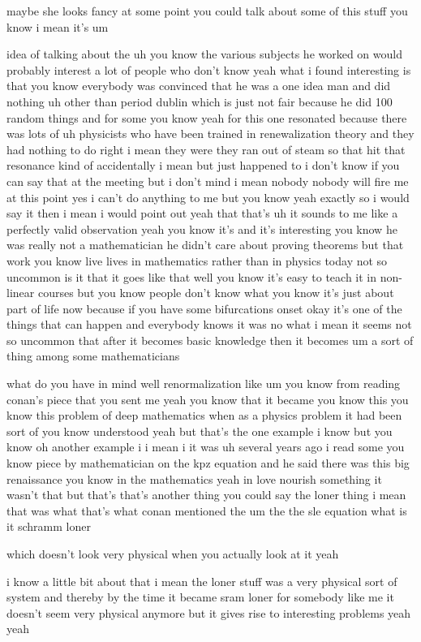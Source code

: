 \begin{description}
maybe she looks fancy at some point you could talk about some of this stuff you know i mean it's um

idea of talking about the uh you know the various subjects he worked on would probably interest a lot of people who don't know yeah what i found interesting is that you know everybody was convinced that he was a one idea man and did nothing uh other than period dublin which is just not fair because he did 100 random things and for some you know yeah for this one resonated because there was lots of uh physicists who have been trained in renewalization theory and they had nothing to do right i mean they were they ran out of steam so that hit that resonance kind of accidentally i mean but just happened to i don't know if you can say that at the meeting but i don't mind i mean nobody nobody will fire me at this point yes i can't do anything to me but you know yeah exactly so i would say it then i mean i would point out yeah that that's uh it sounds to me like a perfectly valid observation yeah you know it's and it's interesting you know he was really not a mathematician he didn't care about proving theorems but that work you know live lives in mathematics rather than in physics today not so uncommon is it that it goes like that well you know it's easy to teach it in non-linear courses but you know people don't know what you know it's just about part of life now because if you have some bifurcations onset okay it's one of the things that can happen and everybody knows it was no what i mean it seems not so uncommon that after it becomes basic knowledge then it becomes um a sort of thing among some mathematicians

what do you have in mind well renormalization like um you know from reading conan's piece that you sent me yeah you know that it became you know this you know this problem of deep mathematics when as a physics problem it had been sort of you know understood yeah but that's the one example i know but you know oh another example i i mean i it was uh several years ago i read some you know piece by mathematician on the kpz equation and he said there was this big renaissance you know in the mathematics yeah in love nourish something it wasn't that but that's that's another thing you could say the loner thing i mean that was what that's what conan mentioned the um the the sle equation what is it schramm loner

which doesn't look very physical when you actually look at it yeah

i know a little bit about that i mean the loner stuff was a very physical sort of system and thereby by the time it became sram loner for somebody like me it doesn't seem very physical anymore but it gives rise to interesting problems yeah yeah


\end{description}
